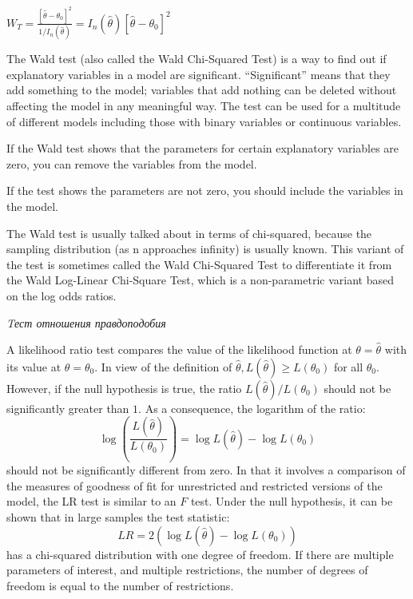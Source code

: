 \documentclass[a4paper,8pt]{article} %
\begin{document}
$W_{T}=\frac{\left[\hat{\theta}-\theta_{0}\right]^{2}}{1 / I_{n}(\hat{\theta})}=I_{n}(\hat{\theta})\left[\hat{\theta}-\theta_{0}\right]^{2}$

The Wald test (also called the Wald Chi-Squared Test) is a way to find out if explanatory variables in a model are significant. “Significant” means that they add something to the model; variables that add nothing can be deleted without affecting the model in any meaningful way. The test can be used for a multitude of different models including those with binary variables or continuous variables.

If the Wald test shows that the parameters for certain explanatory variables are zero, you can remove the variables from the model.

If the test shows the parameters are not zero, you should include the variables in the model.


The Wald test is usually talked about in terms of chi-squared, because the sampling distribution (as n approaches infinity) is usually known. This variant of the test is sometimes called the Wald Chi-Squared Test to differentiate it from the Wald Log-Linear Chi-Square Test, which is a non-parametric variant based on the log odds ratios.

\textit{Tест  отношения  правдоподобия}


A likelihood ratio test compares the value of the likelihood function at $\theta=\widehat{\theta}$ with its value at $\theta=\theta_{0} .$ In view of the definition of $\widehat{\theta}, L(\widehat{\theta}) \geq L\left(\theta_{0}\right)$ for all $\theta_{0} .$ However, if the null hypothesis is true, the ratio $L(\widehat{\theta}) / L\left(\theta_{0}\right)$ should not be significantly greater than $1 .$ As a consequence, the logarithm of the ratio:
$$
\log \left(\frac{L(\widehat{\theta})}{L\left(\theta_{0}\right)}\right)=\log L(\widehat{\theta})-\log L\left(\theta_{0}\right)
$$
should not be significantly different from zero. In that it involves a comparison of the measures of goodness of fit for unrestricted and restricted versions of the model, the LR test is similar to an $F$ test.
Under the null hypothesis, it can be shown that in large samples the test statistic:
$$
L R=2\left(\log L(\widehat{\theta})-\log L\left(\theta_{0}\right)\right)
$$
has a chi-squared distribution with one degree of freedom. If there are multiple parameters of interest, and multiple restrictions, the number of degrees of freedom is equal to the number of restrictions.
\end{document}
